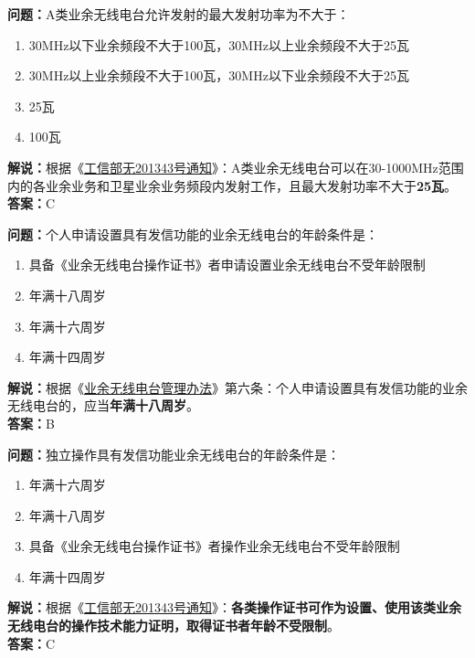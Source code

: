\textbf{问题：}A类业余无线电台允许发射的最大发射功率为不大于：
\begin{enumerate}[label=\Alph*), leftmargin=1cm]
	\item 30MHz以下业余频段不大于100瓦，30MHz以上业余频段不大于25瓦
	\item 30MHz以上业余频段不大于100瓦，30MHz以下业余频段不大于25瓦
	\item 25瓦
	\item 100瓦
\end{enumerate}
\textbf{解说：}根据《\href{http://www.crac.org.cn/wp-content/uploads/2013/02/%E5%B7%A5%E4%BF%A1%E9%83%A8%E6%97%A0201343%E5%8F%B7.pdf}{工信部无201343号通知}》：A类业余无线电台可以在30-1000MHz范围内的各业余业务和卫星业余业务频段内发射工作，且最大发射功率不大于\textbf{25瓦}。\\\textbf{答案：}C


\textbf{问题：}个人申请设置具有发信功能的业余无线电台的年龄条件是：
\begin{enumerate}[label=\Alph*), leftmargin=1cm]
	\item 具备《业余无线电台操作证书》者申请设置业余无线电台不受年龄限制
	\item 年满十八周岁
	\item 年满十六周岁
	\item 年满十四周岁
\end{enumerate}
\textbf{解说：}根据《\href{https://www.miit.gov.cn/jgsj/zfs/bmgz/art/2020/art_147b69815b3641caad9047735f94c860.html}{业余无线电台管理办法}》第六条：个人申请设置具有发信功能的业余无线电台的，应当\textbf{年满十八周岁}。\\\textbf{答案：}B


\textbf{问题：}独立操作具有发信功能业余无线电台的年龄条件是：
\begin{enumerate}[label=\Alph*), leftmargin=1cm]
	\item 年满十六周岁
	\item 年满十八周岁
	\item 具备《业余无线电台操作证书》者操作业余无线电台不受年龄限制
	\item 年满十四周岁
\end{enumerate}
\textbf{解说：}根据《\href{http://www.crac.org.cn/wp-content/uploads/2013/02/%E5%B7%A5%E4%BF%A1%E9%83%A8%E6%97%A0201343%E5%8F%B7.pdf}{工信部无201343号通知}》：\textbf{各类操作证书可作为设置、使用该类业余无线电台的操作技术能力证明，取得证书者年龄不受限制}。\\\textbf{答案：}C


